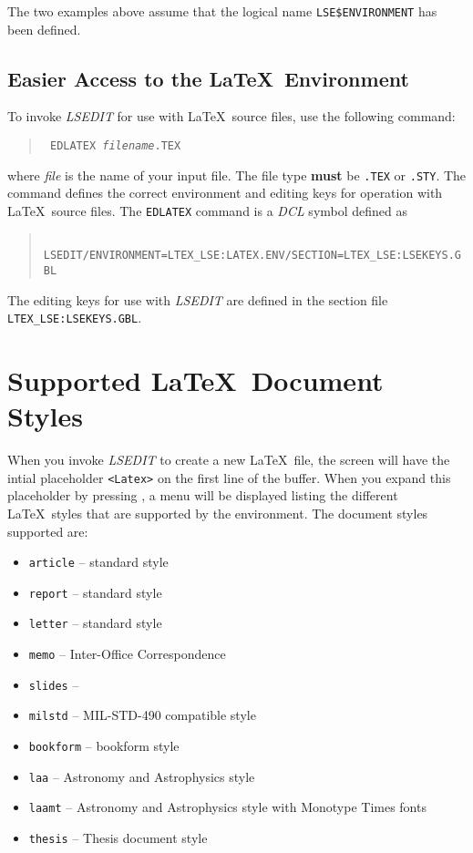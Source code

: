 The two examples above assume that the logical name \verb|LSE$ENVIRONMENT| has
been defined.

\subsection{Easier Access to the \LaTeX\ Environment}

To invoke {\sl LSEDIT\/} for use with \LaTeX\ source files, use the
following command:
\begin{quote}
\tt
\prompt{} EDLATEX {\it filename\/}.TEX \hfill
\end{quote}

where {\it file\/} is the name of your input file.  The file type {\bf must} be
{\tt .TEX} or {\tt .STY}. The command defines the correct environment and
editing keys for operation with \LaTeX\ source files.
The {\tt EDLATEX} command is a {\sl DCL\/} symbol defined as

\begin{quote}
\tt
LSEDIT/ENVIRONMENT=LTEX\_LSE:LATEX.ENV/SECTION=LTEX\_LSE:LSEKEYS.GBL \hfill
\end{quote}

The editing keys for use with {\sl LSEDIT\/} are defined in the
section file {\tt LTEX\_LSE:LSEKEYS.GBL}.

\section{Supported \LaTeX\ Document Styles}

When you invoke {\sl LSEDIT\/} to create a new \LaTeX\ file, the screen will
have the intial placeholder \verb"<Latex>" on the first line of the buffer.
When you expand this placeholder by pressing , a menu will be displayed
listing the different \LaTeX\ styles that are supported by the environment.
The document styles supported are:

\begin{itemize}
\item {\tt article} -- standard style
\item {\tt report} -- standard style
\item {\tt letter} -- standard style
\item {\tt memo} -- Inter-Office Correspondence
\item {\tt slides} -- \SLiTeX{}
\item {\tt milstd} -- MIL-STD-490 compatible style
\item {\tt bookform} -- bookform style
\item {\tt laa} -- Astronomy and Astrophysics style
\item {\tt laamt} -- Astronomy and Astrophysics style with Monotype Times fonts
\item {\tt thesis} -- Thesis document style
\end{itemize}

